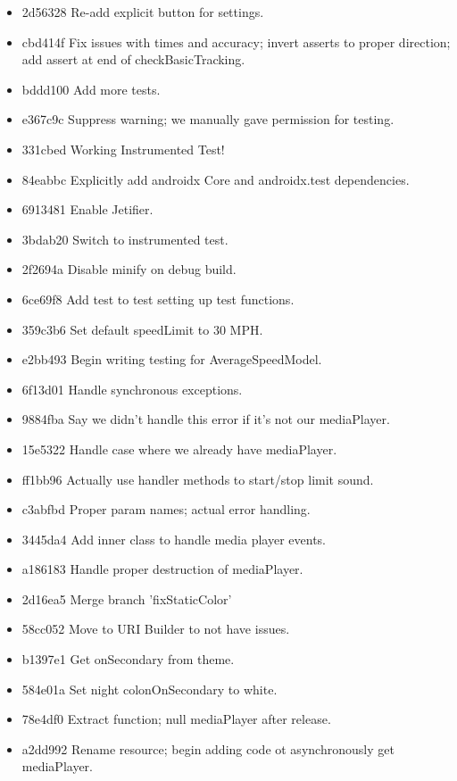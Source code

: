 \documentclass[11pt, a4paper, notitlepage]{report}
\begin{document}
\begin{itemize}
	\item 2d56328 Re-add explicit button for settings. 
	\item cbd414f Fix issues with times and accuracy; invert asserts to proper direction; add assert at end of checkBasicTracking. 
	\item bddd100 Add more tests. 
	\item e367c9c Suppress warning; we manually gave permission for testing. 
	\item 331cbed Working Instrumented Test! 
	\item 84eabbc Explicitly add androidx Core and androidx.test dependencies. 
	\item 6913481 Enable Jetifier. 
	\item 3bdab20 Switch to instrumented test. 
	\item 2f2694a Disable minify on debug build. 
	\item 6ce69f8 Add test to test setting up test functions. 
	\item 359c3b6 Set default speedLimit to 30 MPH. 
	\item e2bb493 Begin writing testing for AverageSpeedModel. 
	\item 6f13d01 Handle synchronous exceptions. 
	\item 9884fba Say we didn't handle this error if it's not our mediaPlayer. 
	\item 15e5322 Handle case where we already have mediaPlayer. 
	\item ff1bb96 Actually use handler methods to start/stop limit sound. 
	\item c3abfbd Proper param names; actual error handling. 
	\item 3445da4 Add inner class to handle media player events. 
	\item a186183 Handle proper destruction of mediaPlayer. 
	\item 2d16ea5 Merge branch 'fixStaticColor' 
	\item 58cc052 Move to URI Builder to not have issues. 
	\item b1397e1 Get onSecondary from theme. 
	\item 584e01a Set night colonOnSecondary to white. 
	\item 78e4df0 Extract function; null mediaPlayer after release. 
	\item a2dd992 Rename resource; begin adding code ot asynchronously get mediaPlayer. 

\end{itemize}
\end{document}
